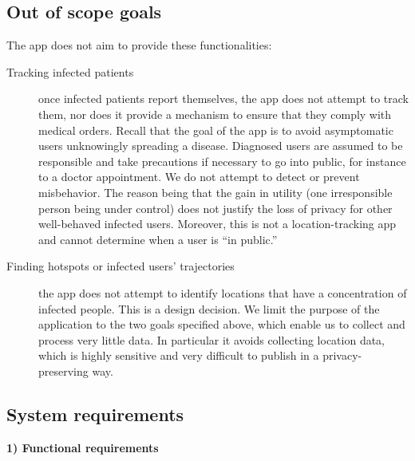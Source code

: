 \documentclass[10.8pt,a4paper]{article}
\begin{document}
\subsection{Out of scope goals}

The app does not aim to provide these functionalities:

\begin{description}
\item[Tracking infected patients ] once infected patients report themselves, the app does
not attempt to track them, nor does it provide a mechanism to ensure that they comply with medical orders. Recall that the goal of the app is to avoid asymptomatic users unknowingly spreading a disease. Diagnosed users are assumed to be responsible and take precautions if necessary to go into public, for instance to a doctor appointment. We do not attempt to detect or prevent misbehavior. The reason being that the gain in utility (one irresponsible person being under control) does not justify the loss of privacy for other well-behaved infected users. Moreover, this is not a location-tracking app and cannot determine when a user is “in public.”
\item[Finding hotspots or infected users’ trajectories ] the app does not attempt to identify locations that have a concentration of infected people. This is a design decision. We limit the purpose of the application to the two goals specified above, which enable us to collect and process very little data. In particular it avoids collecting location data, which is highly sensitive and very difficult to publish in a privacy-preserving way.
\end{description}

\subsection{System requirements}

\textbf{1) Functional requirements}
\end{document}
